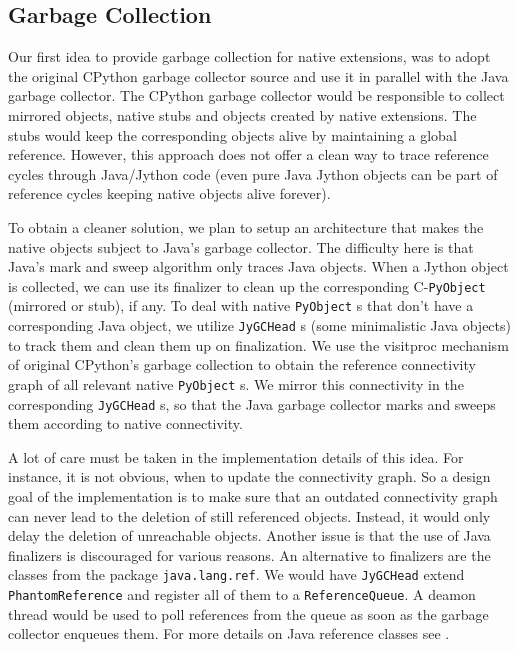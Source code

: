 \documentclass[letterpaper,compsoc,twoside]{IEEEtran}
\begin{document}
\subsection{Garbage Collection\label{garbage-collection}}


Our first idea to provide garbage collection for native extensions, was to adopt the original CPython garbage collector source and use it in parallel with the Java garbage collector.
The CPython garbage collector would be responsible to collect mirrored objects, native stubs and objects created by native extensions. The stubs would keep the corresponding objects alive by maintaining a global reference. However, this approach does not offer a clean way to trace reference cycles through Java/Jython code (even pure Java Jython objects can be part of reference cycles keeping native objects alive forever).

To obtain a cleaner solution, we plan to setup an architecture that makes the native objects subject to Java's garbage collector. The difficulty here is that Java's mark and sweep algorithm only traces Java objects. When a Jython object is collected, we can use its finalizer to clean up the corresponding C-\texttt{PyObject} (mirrored or stub), if any. To deal with native \texttt{PyObject} s that don't have a corresponding Java object, we utilize \texttt{JyGCHead} s (some minimalistic Java objects) to track them and clean them up on finalization. We use the visitproc mechanism of original CPython's garbage collection to obtain the reference connectivity graph of all relevant native \texttt{PyObject} s. We mirror this connectivity in the corresponding \texttt{JyGCHead} s, so that the Java garbage collector marks and sweeps them according to native connectivity.

A lot of care must be taken in the implementation details of this idea. For instance, it is not obvious, when to update the connectivity graph. So a design goal of the implementation is to make sure that an outdated connectivity graph can never lead to the deletion of still referenced objects. Instead, it would only delay the deletion of unreachable objects. Another issue is that the use of Java finalizers is discouraged for various reasons. An alternative to finalizers are the classes from the package \texttt{java.lang.ref}. We would have \texttt{JyGCHead} extend \texttt{PhantomReference} and register all of them to a \texttt{ReferenceQueue}. A deamon thread would be used to poll references from the queue as soon as the garbage collector enqueues them. For more details on Java reference classes see \cite{JREF}.
\end{document}
